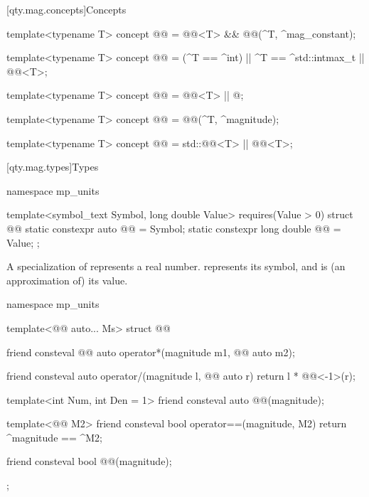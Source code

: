 [qty.mag.concepts]{Concepts}

\begin{itemdecl}
template<typename T>
concept @@ = @@<T> && @@(^T, ^mag_constant);

template<typename T>
concept @@ = (^T == ^int) || ^T == ^std::intmax_t || @@<T>;

template<typename T>
concept @@ = @@<T> || @\unspecnc@;

template<typename T>
concept @@ = @@(^T, ^magnitude);

template<typename T>
concept @@ = std::@@<T> || @@<T>;
\end{itemdecl}

[qty.mag.types]{Types}

\begin{codeblock}
namespace mp_units {

template<symbol_text Symbol, long double Value>
  requires(Value > 0)
struct @@ {
  static constexpr auto @@ = Symbol;
  static constexpr long double @@ = Value;
};

}
\end{codeblock}

A specialization of  represents a real number.
 represents its symbol, and
 is (an approximation of) its value.

\begin{codeblock}
namespace mp_units {

template<@@ auto... Ms>
struct @@ {
  friend consteval @@ auto operator*(magnitude m1, @@ auto m2);

  friend consteval auto operator/(magnitude l, @@ auto r) { return l * @@<-1>(r); }

  template<int Num, int Den = 1>
  friend consteval auto @@(magnitude);

  template<@@ M2>
  friend consteval bool operator==(magnitude, M2)
  {
    return ^magnitude == ^M2;
  }

  friend consteval bool @@(magnitude);
};

}
\end{codeblock}

